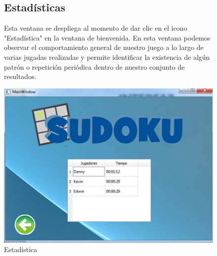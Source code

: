 \documentclass[12pt,oneside]{book}
\begin{document}
\begin{figure}
			\subsection{Estadísticas}
			\newpage
Esta ventana se despliega al momento de dar clic en el icono "Estadística" en la ventana de bienvenida. En esta ventana podemos observar el comportamiento general de nuestro juego a lo largo de varias jugadas realizadas y permite identificar la existencia de algún patrón o repetición periódica dentro de nuestro conjunto de resultados.
			
				\begin{center} 
					\includegraphics[width=.60\textwidth]{./imagenes/estadisticas.jpg}
					\caption{Estadistica}
					\label{estadistica}
				\end{center}
			

\end{figure}
\end{document}
